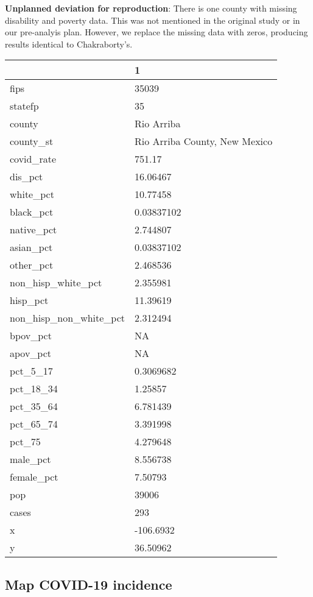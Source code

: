 \documentclass[
]{article}
\begin{document}
\textbf{Unplanned deviation for reproduction}: There is one county with
missing disability and poverty data. This was not mentioned in the
original study or in our pre-analyis plan. However, we replace the
missing data with zeros, producing results identical to Chakraborty's.

\begin{tabular}{l|l}
\hline
  & 1\\
\hline
fips & 35039\\
\hline
statefp & 35\\
\hline
county & Rio Arriba\\
\hline
county\_st & Rio Arriba County, New Mexico\\
\hline
covid\_rate & 751.17\\
\hline
dis\_pct & 16.06467\\
\hline
white\_pct & 10.77458\\
\hline
black\_pct & 0.03837102\\
\hline
native\_pct & 2.744807\\
\hline
asian\_pct & 0.03837102\\
\hline
other\_pct & 2.468536\\
\hline
non\_hisp\_white\_pct & 2.355981\\
\hline
hisp\_pct & 11.39619\\
\hline
non\_hisp\_non\_white\_pct & 2.312494\\
\hline
bpov\_pct & NA\\
\hline
apov\_pct & NA\\
\hline
pct\_5\_17 & 0.3069682\\
\hline
pct\_18\_34 & 1.25857\\
\hline
pct\_35\_64 & 6.781439\\
\hline
pct\_65\_74 & 3.391998\\
\hline
pct\_75 & 4.279648\\
\hline
male\_pct & 8.556738\\
\hline
female\_pct & 7.50793\\
\hline
pop & 39006\\
\hline
cases & 293\\
\hline
x & -106.6932\\
\hline
y & 36.50962\\
\hline
\end{tabular}

\hypertarget{map-covid-19-incidence}{%
\subsection{Map COVID-19 incidence}\label{map-covid-19-incidence}}
\end{document}
